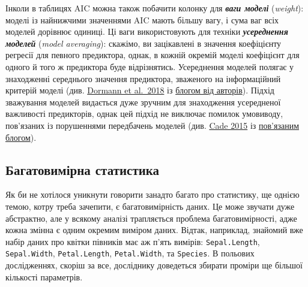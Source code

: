 \documentclass[
  11pt,
]{book}
\begin{document}
Інколи в таблицях AIC можна також побачити колонку для \textbf{\emph{ваги моделі}} (\emph{weight}): моделі із найнижчими значеннями AIC мають більшу вагу, і сума ваг всіх моделей дорівнює одиниці. Ці ваги використовують для техніки \textbf{\emph{усереднення моделей}} (\emph{model averaging}): скажімо, ви зацікавлені в значення коефіцієнту регресії для певного предиктора, однак, в кожній окремій моделі коефіцієнт для одного й того ж предиктора буде відрізнятись. Усереднення моделей полягає у знаходженні середнього значення предиктора, зваженого на інформаційний критерій моделі (див. \href{https://doi.org/10.1002/ecm.1309}{Dormann et al.~2018} із \href{https://theoreticalecology.wordpress.com/2018/05/14/model-averaging-in-ecology-a-review-of-bayesian-information-theoretic-and-tactical-approaches-for-predictive-inference/}{блогом від авторів}). Підхід зважування моделей видається дуже зручним для знаходження усередненої важливості предикторів, однак цей підхід не виключає помилок умовиводу, пов'язаних із порушеннями передбачень моделей (див. \href{https://doi.org/10.1890/14-1639.1}{Cade 2015} із \href{https://atyre2.github.io/2017/06/16/rebutting_cade.html}{пов'язаним блогом}).

\subsection{Багатовимірна статистика}\label{prcomp}

Як би не хотілося уникнути говорити занадто багато про статистику, ще однією темою, котру треба зачепити, є багатовимірність даних. Це може звучати дуже абстрактно, але у всякому аналізі трапляється проблема багатовимірності, адже кожна змінна є одним окремим виміром даних. Відтак, наприклад, знайомий вже набір даних про квітки півників має аж п'ять вимірів: \texttt{Sepal.Length}, \texttt{Sepal.Width}, \texttt{Petal.Length}, \texttt{Petal.Width}, та \texttt{Species}. В польових дослідженнях, скоріш за все, досліднику доведеться збирати проміри ще більшої кількості параметрів.
\end{document}
